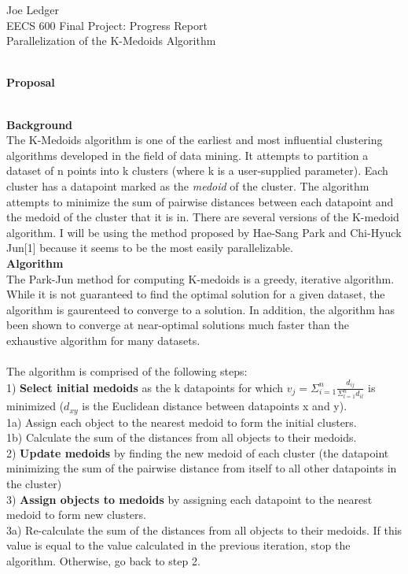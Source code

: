 \documentclass{article}
\begin{document}
Joe Ledger \\
EECS 600 Final Project: Progress Report \\
Parallelization of the K-Medoids Algorithm \\~\\

\begin{center}
\textbf{Proposal} \\~\\
\end{center}

\textbf{Background} \\
The K-Medoids algorithm is one of the earliest and most influential clustering algorithms developed in the field of data mining. 
It attempts to partition a dataset of n points into k clusters (where k is a user-supplied parameter).
Each cluster has a datapoint marked as the \textit{medoid} of the cluster. 
The algorithm attempts to minimize the sum of pairwise distances between each datapoint and the medoid of the cluster that it is in. 
There are several versions of the K-medoid algorithm. 
I will be using the method proposed by Hae-Sang Park and Chi-Hyuck Jun[1] because it seems to be the most easily parallelizable. \\

\textbf{Algorithm} \\
The Park-Jun method for computing K-medoids is a greedy, iterative algorithm. 
While it is not guaranteed to find the optimal solution for a given dataset, the algorithm is gaurenteed to converge to a solution. 
In addition, the algorithm has been shown to converge at near-optimal solutions much faster than the exhaustive algorithm for many datasets. \\~\\
The algorithm is comprised of the following steps: \\
1) \textbf{Select initial medoids} as the k datapoints for which $v_j = \Sigma_{i=1}^n \frac{d_{ij}}{\Sigma_{l=1}^n d_{il}}$ is minimized ($d_{xy}$ is the Euclidean distance between datapoints x and y). \\
1a) Assign each object to the nearest medoid to form the initial clusters. \\
1b) Calculate the sum of the distances from all objects to their medoids. \\
2) \textbf{Update medoids} by finding the new medoid of each cluster (the datapoint minimizing the sum of the pairwise distance from itself to all other datapoints in the cluster) \\
3) \textbf{Assign objects to medoids} by assigning each datapoint to the nearest medoid to form new clusters. \\
3a) Re-calculate the sum of the distances from all objects to their medoids. If this value is equal to the value calculated in the previous iteration, stop the algorithm. Otherwise, go back to step 2. \\
\end{document}
